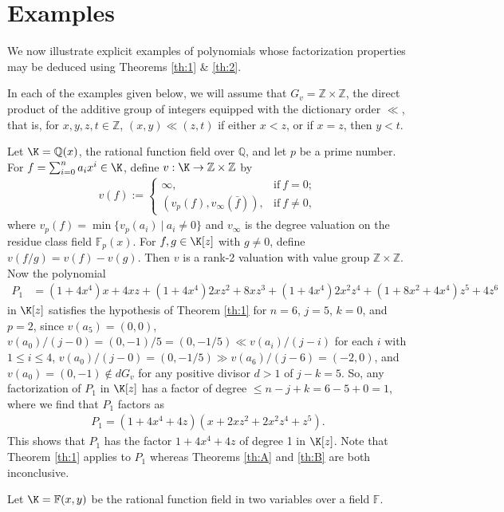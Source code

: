 \documentclass[12pt]{amsart}%
\begin{document}
\section{Examples}
We now illustrate explicit examples of polynomials whose factorization properties may be deduced using Theorems \ref{th:1} \& \ref{th:2}.

In each of the  examples given below, we will assume that $G_v=\mathbb{Z}\times \mathbb{Z}$, the direct product of the additive group of integers equipped with the dictionary order $\ll$, that is, for  $x,y,z,t\in \mathbb{Z}$, $(x,y)\ll(z,t)$ if either $x<z$, or if $x=z$, then $y<t$.
	\begin{example}
Let $\K=\mathbb{Q}(x)$, the rational function field over $\mathbb{Q}$, and let $p$ be a prime number. For $f=\sum_{i=0}^{n}a_ix^i \in \K$, define $v:\K \rightarrow \mathbb{Z} \times \mathbb{Z}$ by
		\begin{eqnarray*}
			v(f):=\begin{cases} \infty, & \text{if}~ f=0;\\
				(v_p(f),v_\infty(\bar{f})), & \text{if}~ f\neq 0,
			\end{cases}
		\end{eqnarray*}
		where $v_p(f)=\min\{v_p(a_i) ~|~ a_i\neq 0\}$ and $v_\infty$ is the degree valuation on the residue class field $\mathbb{F}_p(x)$. For $f,g \in \K[z]$ with $g\neq 0$, define $v(f/g)=v(f)-v(g)$. Then $v$ is a rank-2 valuation with value group $\mathbb{Z} \times \mathbb{Z}$. Now the polynomial
		\begin{align*}
			P_1 &= (1+4x^4)x+4xz+(1+4x^4)2xz^2+8xz^3+(1+4x^4)2x^2z^4+(1+8x^2+4x^4)z^5+4z^6
		\end{align*}
in $\K[z]$ satisfies the hypothesis of Theorem \ref{th:1} for $n=6$, $j=5$, $k=0$, and $p=2$, since $v(a_5)=(0,0)$, $v(a_0)/(j-0)=(0,-1)/5=(0,-1/5)\ll v(a_i)/(j-i)$ for each $i$ with $1\leq i\leq 4$, $v(a_0)/(j-0)=(0,-1/5)\gg v(a_6)/(j-6)=(-2,0)$, and $v(a_0)=(0,-1)\notin dG_v$ for any positive divisor $d>1$ of $j-k=5$. So, any factorization of $P_1$ in $\K[z]$ has a factor of degree $\leq n-j+k=6-5+0=1$, where we find that $P_1$ factors as
		\begin{eqnarray*}
			P_1=(1+4x^4+4z)(x+2xz^2+2x^2z^4+z^5).
		\end{eqnarray*}
This shows that $P_1$ has the factor $1+4x^4+4z$ of degree 1 in $\K[z]$. Note that Theorem \ref{th:1} applies to $P_1$ whereas  Theorems \ref{th:A} and \ref{th:B} are both inconclusive.
	\end{example}
Let $\K=\mathbb{F}(x,y)$ be the rational function field in two variables over a field $\mathbb{F}$.
\end{document}
